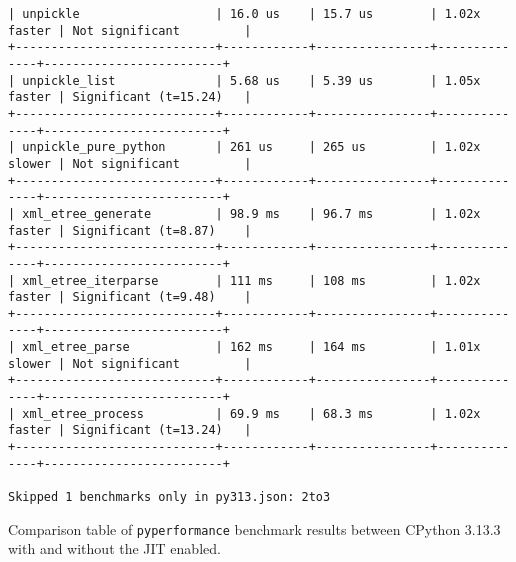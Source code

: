 \begin{code}
\begin{verbatim}
| unpickle                   | 16.0 us    | 15.7 us        | 1.02x faster | Not significant         |
+----------------------------+------------+----------------+--------------+-------------------------+
| unpickle_list              | 5.68 us    | 5.39 us        | 1.05x faster | Significant (t=15.24)   |
+----------------------------+------------+----------------+--------------+-------------------------+
| unpickle_pure_python       | 261 us     | 265 us         | 1.02x slower | Not significant         |
+----------------------------+------------+----------------+--------------+-------------------------+
| xml_etree_generate         | 98.9 ms    | 96.7 ms        | 1.02x faster | Significant (t=8.87)    |
+----------------------------+------------+----------------+--------------+-------------------------+
| xml_etree_iterparse        | 111 ms     | 108 ms         | 1.02x faster | Significant (t=9.48)    |
+----------------------------+------------+----------------+--------------+-------------------------+
| xml_etree_parse            | 162 ms     | 164 ms         | 1.01x slower | Not significant         |
+----------------------------+------------+----------------+--------------+-------------------------+
| xml_etree_process          | 69.9 ms    | 68.3 ms        | 1.02x faster | Significant (t=13.24)   |
+----------------------------+------------+----------------+--------------+-------------------------+

Skipped 1 benchmarks only in py313.json: 2to3
    \end{verbatim}
    \caption{Comparison table of \texttt{pyperformance} benchmark results between CPython 3.13.3 with and without the JIT enabled.}
    \label{listing:pyperformance-results-313-313-jit}
\end{code}
